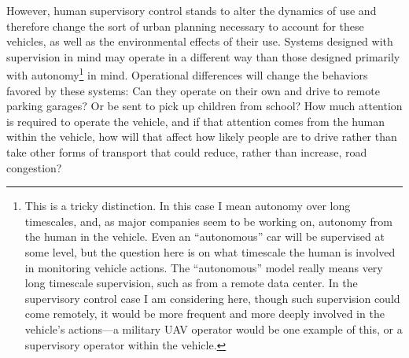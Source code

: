 However, human supervisory control stands to alter the dynamics of use
and therefore change the sort of urban planning necessary to account
for these vehicles, as well as the environmental effects of their use.
Systems designed with supervision in mind may operate in a different
way than those designed primarily with autonomy\footnote{This is a
  tricky distinction. In this case
  I mean autonomy over long timescales, and, as major companies seem
  to be working on, autonomy from the human in the vehicle. Even an
  ``autonomous'' car will be supervised at some level, but the
  question here is on what timescale the human is involved in
  monitoring vehicle actions. The ``autonomous'' model really means very
  long timescale supervision, such as from a remote data center. In
  the supervisory control case I am considering here, though such
  supervision could come remotely, it would be more frequent and more
  deeply involved in the vehicle's actions---a military UAV operator
  would be one example of this, or a supervisory operator within the
  vehicle.} in mind. Operational
differences will change the behaviors favored by these systems:  Can
they operate on their own and drive to remote parking garages? Or be
sent to pick up children from school? How much attention is required
to operate the vehicle, and if that attention comes from the human
within the vehicle, how will that affect how likely people are to
drive rather than take other forms of transport that could reduce,
rather than increase, road congestion? 


